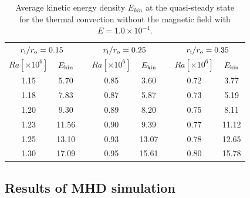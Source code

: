 %
\begin{table}
\caption{Average kinetic energy density $E_{kin}$ at the quasi-steady state \\
for the thermal convection without the magnetic field with $E = 1.0 \times 10^{-4}$.}
\begin{center}
\begin{tabular}{|ccc|ccc|cc|}
   \hline
  \multicolumn{2}{|c|}{$r_{\rm i}/r_{\rm o} = 0.15$} & \hspace{5mm} &
  \multicolumn{2}{|c|}{$r_{\rm i}/r_{\rm o} = 0.25$} & \hspace{5mm} &
  \multicolumn{2}{|c|}{$r_{\rm i}/r_{\rm o} = 0.35$} \\
  $Ra[\times 10^6] $ &  $E_{\rm kin}$ & &
  $Ra[\times 10^6] $ &  $E_{\rm kin}$ & &
  $Ra[\times 10^6] $ &  $E_{\rm kin}$ \\
    \hline
  1.15 & 5.70 & & 0.85 & 3.60  & & 0.72 & 3.77 \\
  1.18 &  7.83 & & 0.87 & 5.87 & & 0.73 &  5.19 \\
  1.20 &  9.30 & & 0.89 & 8.20 & & 0.75 &  8.11 \\
  1.23 & 11.56 & & 0.90 & 9.39 & & 0.77 & 11.12 \\
  1.25 & 13.10 & & 0.93 & 13.07 & & 0.78 & 12.65  \\
  1.30 & 17.09 & & 0.95  & 15.61 & & 0.80 & 15.78 \\
 \hline
\end{tabular}
\end{center}
\label{table:Rac_Ek4}
\end{table}


\subsection{Results of MHD simulation}

